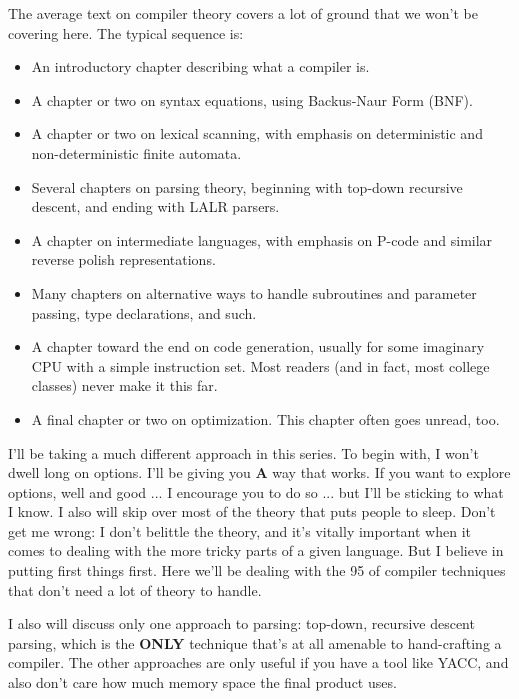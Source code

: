 The average text on compiler theory covers a lot of ground that
we won't be covering here. The typical sequence is:

\begin{itemize}
  \item An introductory chapter describing what a compiler is.
  \item A chapter or two on syntax equations, using Backus-Naur Form
   (BNF).
   \item A chapter or two on lexical scanning, with emphasis on
   deterministic and non-deterministic finite automata.
   \item Several chapters on parsing theory, beginning with top-down
   recursive descent, and ending with LALR parsers.
   \item  A chapter on intermediate languages, with emphasis on P-code
   and similar reverse polish representations.
   \item Many chapters on alternative ways to handle subroutines and
   parameter passing, type declarations, and such.
   \item A chapter toward the end on code generation, usually for some
   imaginary CPU with a simple instruction set.  Most readers
   (and in fact, most college classes) never make it this far.
   \item A final chapter or two on optimization. This chapter often
   goes unread, too.
\end{itemize}


I'll  be taking a much different approach in  this  series.    To
begin  with,  I  won't dwell long on options.  I'll be giving you
\textbf{A} way that works.  If you want  to  explore  options,  well and
good ...  I  encourage  you  to do so ... but I'll be sticking to
what I know.   I also will skip over most of the theory that puts
people  to  sleep.  Don't get me  wrong:  I  don't  belittle  the
theory, and it's vitally important  when it comes to dealing with
the more tricky  parts  of  a  given  language.  But I believe in
putting first things first.    Here we'll be dealing with the 95%
of compiler techniques that don't need a lot of theory to handle.

I  also  will  discuss only one approach  to  parsing:  top-down,
recursive descent parsing, which is the  \textbf{ONLY}  technique that's
at  all   amenable  to  hand-crafting  a  compiler.    The  other
approaches are only useful if you have a tool like YACC, and also
don't care how much memory space the final product uses.
                              
